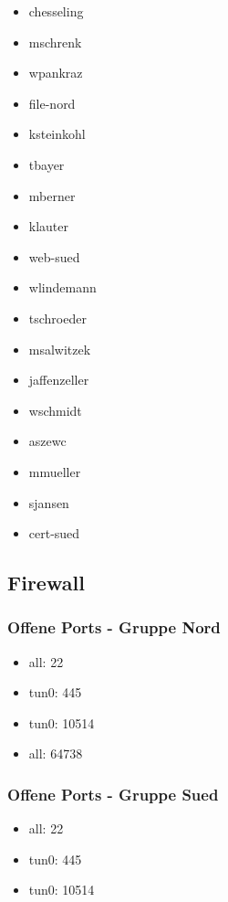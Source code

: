 \begin{itemize}
  \item chesseling
  \item mschrenk
  \item wpankraz
  \item file-nord
  \item ksteinkohl
  \item tbayer
  \item mberner
  \item klauter
  \item web-sued
  \item wlindemann
  \item tschroeder
  \item msalwitzek
  \item jaffenzeller
  \item wschmidt
  \item aszewc
  \item mmueller
  \item sjansen
  \item cert-sued
\end{itemize}
\subsection{Firewall}
\subsubsection{Offene Ports - Gruppe Nord}
\begin{itemize}
  \item all: 22
  \item tun0: 445
  \item tun0: 10514
  \item all: 64738
\end{itemize}
\subsubsection{Offene Ports - Gruppe Sued}
\begin{itemize}
  \item all: 22
  \item tun0: 445
  \item tun0: 10514
\end{itemize}
